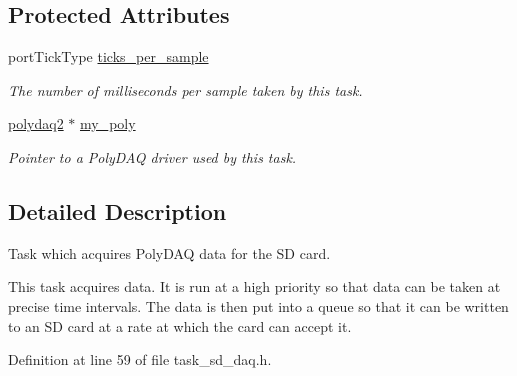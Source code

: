 \subsection*{Protected Attributes}
\begin{DoxyCompactItemize}
\item 
\hypertarget{classtask__sd__daq_aa5514658115b89432355c9382a7aeac4}{port\-Tick\-Type \hyperlink{classtask__sd__daq_aa5514658115b89432355c9382a7aeac4}{ticks\-\_\-per\-\_\-sample}}\label{classtask__sd__daq_aa5514658115b89432355c9382a7aeac4}

\begin{DoxyCompactList}\small\item\em The number of milliseconds per sample taken by this task. \end{DoxyCompactList}\item 
\hypertarget{classtask__sd__daq_a9e84d9575b597ca3e78bec411eecdcae}{\hyperlink{classpolydaq2}{polydaq2} $\ast$ \hyperlink{classtask__sd__daq_a9e84d9575b597ca3e78bec411eecdcae}{my\-\_\-poly}}\label{classtask__sd__daq_a9e84d9575b597ca3e78bec411eecdcae}

\begin{DoxyCompactList}\small\item\em Pointer to a Poly\-D\-A\-Q driver used by this task. \end{DoxyCompactList}\end{DoxyCompactItemize}


\subsection{Detailed Description}
Task which acquires Poly\-D\-A\-Q data for the S\-D card. 

This task acquires data. It is run at a high priority so that data can be taken at precise time intervals. The data is then put into a queue so that it can be written to an S\-D card at a rate at which the card can accept it. 

Definition at line 59 of file task\-\_\-sd\-\_\-daq.\-h.




